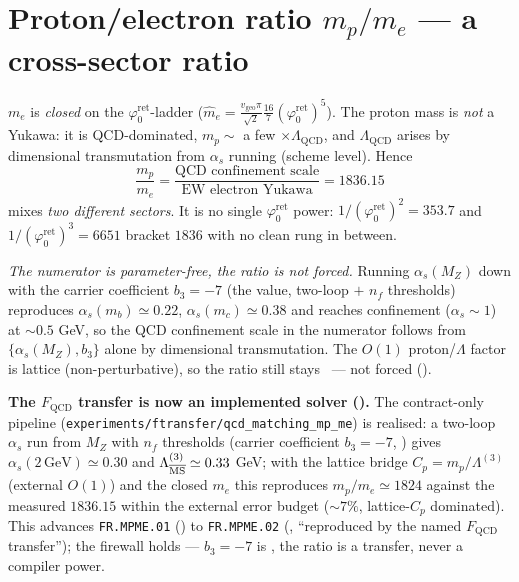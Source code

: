\documentclass[11pt,a4paper]{article}
\newcommand{\phiz}{\varphi_0^{\mathrm{ret}}}
\begin{document}
\section{Proton/electron ratio $m_p/m_e$ --- a cross-sector ratio}
$m_e$ is \emph{closed} on the $\phiz$-ladder ($\hat m_e=\tfrac{v_{\mathrm{geo}}\pi}{\sqrt2}\tfrac{16}{7}(\phiz)^5$).
The proton mass is \emph{not} a Yukawa: it is QCD-dominated, $m_p\sim$ a few $\times\Lambda_{\mathrm{QCD}}$,
and $\Lambda_{\mathrm{QCD}}$ arises by dimensional transmutation from $\alpha_s$ running (scheme level).
Hence
\[
  \frac{m_p}{m_e}=\frac{\text{QCD confinement scale}}{\text{EW electron Yukawa}}=1836.15
\]
mixes \emph{two different sectors}. It is no single $\phiz$ power: $1/(\phiz)^2=353.7$ and
$1/(\phiz)^3=6651$ bracket $1836$ with no clean rung in between.

\emph{The numerator is parameter-free, the ratio is not forced.} Running $\alpha_s(M_Z)$ down
with the carrier coefficient $b_3=-7$ (the  value,
two-loop $+$ $n_f$ thresholds) reproduces $\alpha_s(m_b)\simeq0.22$, $\alpha_s(m_c)\simeq0.38$ and
reaches confinement ($\alpha_s\sim1$) at $\sim0.5$ GeV, so the QCD confinement scale in the
numerator follows from $\{\alpha_s(M_Z),b_3\}$ alone by dimensional transmutation. The
$O(1)$ proton/$\Lambda$ factor is lattice (non-perturbative), so the ratio still stays \mO\
--- not forced ().
\par\smallskip\noindent\textbf{The $F_{\mathrm{QCD}}$ transfer is now an implemented solver
(\veri{v262\_fqcd\_mp\_me.py}).} The contract-only pipeline
(\texttt{experiments/ftransfer/qcd\_matching\_mp\_me}) is realised: a two-loop $\alpha_s$ run from
$M_Z$ with $n_f$ thresholds (carrier coefficient $b_3=-7$, \mE) gives $\alpha_s(2\,\text{GeV})\simeq0.30$
and $\Lambda^{(3)}_{\overline{\rm MS}}\simeq0.33$ GeV; with the lattice bridge $C_p=m_p/\Lambda^{(3)}$
(external $O(1)$) and the closed $m_e$ this reproduces $m_p/m_e\simeq1824$ against the measured $1836.15$
within the external error budget ($\sim7\%$, lattice-$C_p$ dominated). This advances \texttt{FR.MPME.01}
(\mO) to \texttt{FR.MPME.02} (\mC, ``reproduced by the named $F_{\mathrm{QCD}}$ transfer''); the firewall
holds --- $b_3=-7$ is \mE, the ratio is a transfer, never a compiler power.
\end{document}
